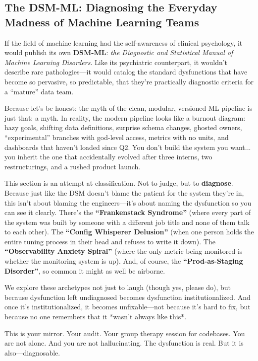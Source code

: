 \subsection{The DSM-ML: Diagnosing the Everyday Madness of Machine Learning Teams}

If the field of machine learning had the self-awareness of clinical psychology, it would publish its own \textbf{DSM-ML}: \textit{the Diagnostic and Statistical Manual of Machine Learning Disorders}. Like its psychiatric counterpart, it wouldn't describe rare pathologies—it would catalog the standard dysfunctions that have become so pervasive, so predictable, that they’re practically diagnostic criteria for a ``mature'' data team.

Because let’s be honest: the myth of the clean, modular, versioned ML pipeline is just that: a myth. In reality, the modern pipeline looks like a burnout diagram: hazy goals, shifting data definitions, surprise schema changes, ghosted owners, ``experimental'' branches with god-level access, metrics with no units, and dashboards that haven't loaded since Q2. You don’t build the system you want... you inherit the one that accidentally evolved after three interns, two restructurings, and a rushed product launch.

This section is an attempt at classification. Not to judge, but to \textbf{diagnose}. Because just like the DSM doesn't blame the patient for the system they’re in, this isn’t about blaming the engineers—it’s about naming the dysfunction so you can see it clearly. There’s the \textbf{``Frankenstack Syndrome''} (where every part of the system was built by someone with a different job title and none of them talk to each other). The \textbf{``Config Whisperer Delusion''} (when one person holds the entire tuning process in their head and refuses to write it down). The \textbf{``Observability Anxiety Spiral''} (where the only metric being monitored is whether the monitoring system is up). And, of course, the \textbf{``Prod-as-Staging Disorder''}, so common it might as well be airborne.

We explore these archetypes not just to laugh (though yes, please do), but because dysfunction left undiagnosed becomes dysfunction institutionalized. And once it’s institutionalized, it becomes unfixable—not because it’s hard to fix, but because no one remembers that it *wasn’t always like this*.

This is your mirror. Your audit. Your group therapy session for codebases. You are not alone. And you are not hallucinating. The dysfunction is real. But it is also—diagnosable.

